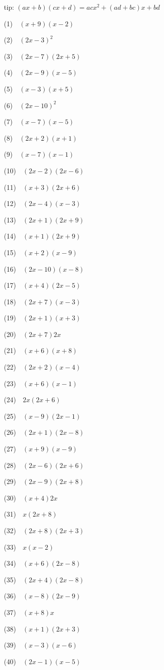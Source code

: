 \documentclass[a4j,10pt,fleqn]{jarticle}
\begin{document}
tip: $(ax + b)(cx + d) = acx^2 + (ad + bc)x + bd$

(1)~~$(x+9)(x-2)$

(2)~~$(2x-3)^2$

(3)~~$(2x-7)(2x+5)$

(4)~~$(2x-9)(x-5)$

(5)~~$(x-3)(x+5)$

(6)~~$(2x-10)^2$

(7)~~$(x-7)(x-5)$

(8)~~$(2x+2)(x+1)$

(9)~~$(x-7)(x-1)$

(10)~~$(2x-2)(2x-6)$

(11)~~$(x+3)(2x+6)$

(12)~~$(2x-4)(x-3)$

(13)~~$(2x+1)(2x+9)$

(14)~~$(x+1)(2x+9)$

(15)~~$(x+2)(x-9)$

(16)~~$(2x-10)(x-8)$

(17)~~$(x+4)(2x-5)$

(18)~~$(2x+7)(x-3)$

(19)~~$(2x+1)(x+3)$

(20)~~$(2x+7)2x$

(21)~~$(x+6)(x+8)$

(22)~~$(2x+2)(x-4)$

(23)~~$(x+6)(x-1)$

(24)~~$2x(2x+6)$

(25)~~$(x-9)(2x-1)$

(26)~~$(2x+1)(2x-8)$

(27)~~$(x+9)(x-9)$

(28)~~$(2x-6)(2x+6)$

(29)~~$(2x-9)(2x+8)$

(30)~~$(x+4)2x$

(31)~~$x(2x+8)$

(32)~~$(2x+8)(2x+3)$

(33)~~$x(x-2)$

(34)~~$(x+6)(2x-8)$

(35)~~$(2x+4)(2x-8)$

(36)~~$(x-8)(2x-9)$

(37)~~$(x+8)x$

(38)~~$(x+1)(2x+3)$

(39)~~$(x-3)(x-6)$

(40)~~$(2x-1)(x-5)$
\end{document}
